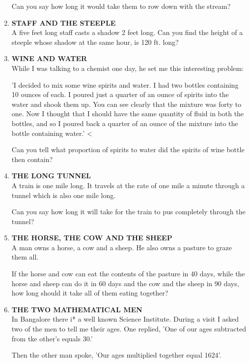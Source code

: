 \documentclass[12pt]{article}
\begin{document}
\begin{enumerate}
Can you say how long it would take them to row down with the stream?
%
\item \textbf{STAFF  AND  THE  STEEPLE} \\ 
A five feet long  staff  casts  a shadow  2 feet  long.  Can you find  the  height  of a steeple  whose  shadow  at the same  hour,  is 120 ft. long? 
%
\item \textbf{WINE  AND  WATER} \\ 
While  I was  talking  to a chemist  one  day,  he set me this interesting  problem: 

'I decided  to mix some  wine  spirits  and water.  I had two bottles  containing  10 ounces  of each.  I poured  just a quarter  of an ounce  of spirits  into  the water  and  shook them  up. You  can see clearly  that  the mixture  was  forty to one.  Now  I thought  that  I should  have  the  same quantity  of fluid  in both  the bottles,  and so I poured  back a quarter  of an ounce  of the  mixture  into  the  bottle containing  water.'  < 

Can you tell what  proportion  of spirits  to water  did the spirits  of wine  bottle  then  contain? 

\item \textbf{THE  LONG  TUNNEL} \\
A train  is one  mile  long.  It travels  at the  rate  of one mile  a minute  through  a tunnel  which  is also  one mile long. 

Can you say how  long  it will take  for the train  to pus completely  through  the tunnel? 

\item \textbf{THE  HORSE,  THE  COW  AND  THE  SHEEP} \\ 
A man  owns  a horse,  a cow  and  a sheep.  He  also owns  a pasture  to graze  them  all. 

If the  horse  and  cow  can  eat  the  contents  of the pasture  in 40 days,  while  the horse  and sheep  can  do it in 60 days  and the cow  and the sheep  in 90 days,  how long should  it take  all of them  eating  together? 

\item \textbf{THE  TWO  MATHEMATICAL  MEN} \\ 
In Bangalore  there  i* a well  known  Science  Institute. During  a visit  I asked  two of the  men  to tell me their ages.  One  replied,  'One  of our ages  subtracted  from  tke other's  equals  30.' 

Then  the other  man  spoke,  'Our  ages  multiplied  together  equal  1624'. 


\end{enumerate}
\end{document}

